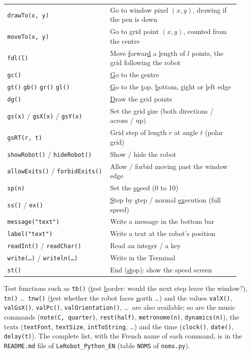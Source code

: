 \documentclass[11pt,a4paper]{article}
\newcommand{\kbd}[1]{\texttt{#1}}
\begin{document}
\begin{longtable}{@{}p{0.42\linewidth} p{0.53\linewidth}@{}}
\kbd{drawTo(x, y)} & Go to window pixel $(x, y)$, drawing if the pen is down \\
\kbd{moveTo(x, y)} & Go to grid point $(x, y)$, counted from the centre \\
\kbd{fdl(l)} & Move \underline{f}orwar\underline{d} a \underline{l}ength of $l$ points, the grid following the robot \\
\kbd{gc()} & \underline{G}o to the \underline{c}entre \\
\kbd{gt()} \kbd{gb()} \kbd{gr()} \kbd{gl()} & \underline{G}o to the \underline{t}op, \underline{b}ottom, \underline{r}ight or \underline{l}eft edge \\
\kbd{dg()} & \underline{D}raw the \underline{g}rid points \\
\kbd{gs(x)} / \kbd{gsX(x)} / \kbd{gsY(x)} & Set the \underline{g}rid \underline{s}ize (both directions / across / up) \\
\kbd{gsRT(r, t)} & Grid step of length $r$ at angle $t$ (polar grid) \\
\kbd{showRobot()} / \kbd{hideRobot()} & Show / hide the robot \\
\kbd{allowExits()} / \kbd{forbidExits()} & Allow / forbid moving past the window edge \\
\kbd{sp(n)} & Set the \underline{sp}eed (0 to 10) \\
\kbd{ss()} / \kbd{ex()} & \underline{S}tep by \underline{s}tep / normal \underline{ex}ecution (full speed) \\
\kbd{message("text")} & Write a message in the bottom bar \\
\kbd{label("text")} & Write a text at the robot's position \\
\kbd{readInt()} / \kbd{readChar()} & Read an integer / a key \\
\kbd{write(\dots)} / \kbd{writeln(\dots)} & Write in the Terminal \\
\kbd{st()} & End (\underline{st}op): show the speed screen \\
\end{longtable}

Test functions such as \kbd{tb()} (\underline{t}est \underline{b}order:
would the next step leave the window?), \kbd{tn()} \dots\ \kbd{tnw()}
(\underline{t}est whether the robot faces \underline{n}orth \dots) and the
values \kbd{valX()}, \kbd{valGsX()}, \kbd{valPc()}, \kbd{valOrientation()},
\dots\ are also available; so are the music commands (\kbd{note(C, quarter)},
\kbd{rest(half)}, \kbd{metronome(n)}, \kbd{dynamics(n)}), the texts
(\kbd{textFont}, \kbd{textSize}, \kbd{intToString}, \dots) and the time
(\kbd{clock()}, \kbd{date()}, \kbd{delay(t)}). The complete list, with the
French name of each command, is in the \kbd{README.md} file of
\kbd{LeRobot\_Python\_EN} (table \kbd{NOMS} of \kbd{noms.py}).
\end{document}
